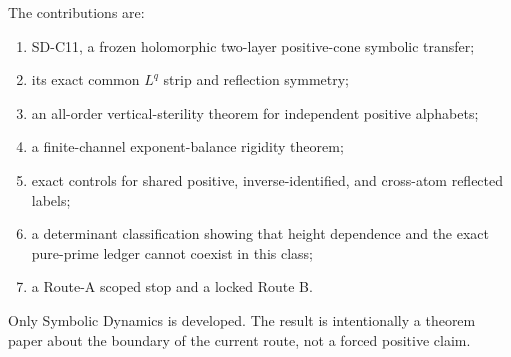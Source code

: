 The contributions are:
\begin{enumerate}
 \item SD-C11, a frozen holomorphic two-layer positive-cone symbolic transfer;
 \item its exact common $L^q$ strip and reflection symmetry;
 \item an all-order vertical-sterility theorem for independent positive
       alphabets;
 \item a finite-channel exponent-balance rigidity theorem;
 \item exact controls for shared positive, inverse-identified, and cross-atom
       reflected labels;
 \item a determinant classification showing that height dependence and the
       exact pure-prime ledger cannot coexist in this class;
 \item a Route-A scoped stop and a locked Route B.
\end{enumerate}

Only Symbolic Dynamics is developed.  The result is intentionally a theorem
paper about the boundary of the current route, not a forced positive claim.
